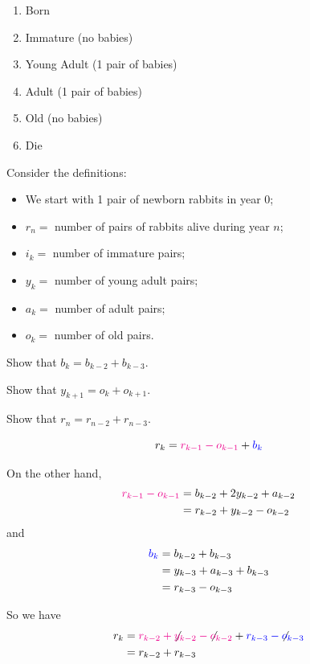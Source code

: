 \begin{minipage}{.45\textwidth}
	\begin{enumerate}[start=0,label=(year \arabic*)]
		\item Born
		\item Immature (no babies)
		\item Young Adult (1 pair of babies)
		\item Adult (1 pair of babies)
		\item Old (no babies)
		\item Die \\[5pt]
	\end{enumerate}	
	
\end{minipage}
\qquad
\begin{minipage}{.45\textwidth}
	Consider the definitions:
	\begin{itemize}
		\item We start with 1 pair of newborn rabbits in year 0;
		\item $r_n=$ number of pairs of rabbits alive during year $n$;
		\item $i_k=$ number of immature pairs;
		\item $y_k=$ number of young adult pairs;
		\item $a_k=$ number of adult pairs;
		\item $o_k=$ number of old pairs.
	\end{itemize}

\end{minipage}

	\begin{parts}
		\item Show that $b_k=b_{k-2}+b_{k-3}$.
		\item Show that $y_{k+1}=o_{k}+o_{k+1}$.
		\item Show that $r_{n} = r_{n-2}+r_{n-3}$.
	\end{parts}

\begin{annotation}
\begin{goals}
$$
r_k 
	= {\color{magenta}r_{k-1}-o_{k-1}}+{\color{blue}b_k}
$$

On the other hand, 
\begin{align*}
\color{magenta}
r_{k-1}-o_{k-1}
  & = b_{k-2} + 2 y_{k-2} + a_{k-2}  \\
  & = r_{k-2} + y_{k-2} - o_{k-2}
\end{align*}
and
\begin{align*}
\color{blue}
b_k 
  & = b_{k-2}+b_{k-3} \\
  & = y_{k-3} + a_{k-3} + b_{k-3} \\
  & = r_{k-3} - o_{k-3}	
\end{align*}


So we have
\begin{align*}
r_k & = {\color{magenta}r_{k-2} + {\color{black}\not} y_{k-2} - {\color{black}\not} o_{k-2}} + {\color{blue}r_{k-3} - {\color{black}\not}o_{k-3}} \\
& = r_{k-2} + r_{k-3}
\end{align*}

\end{goals}
\end{annotation}	

